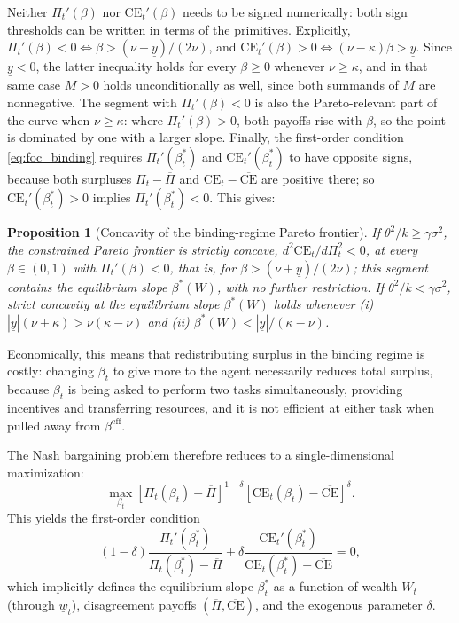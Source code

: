 \documentclass{article}
\newtheorem{proposition}{Proposition}[section]
\theoremstyle{definition}
\theoremstyle{plain}
\begin{document}
Neither $\Pi_t'(\beta)$ nor $\text{CE}_t'(\beta)$ needs to be signed numerically: both sign thresholds can be written in terms of the primitives. Explicitly, $\Pi_t'(\beta) < 0 \iff \beta > (\nu+\underline{y})/(2\nu)$, and $\text{CE}_t'(\beta) > 0 \iff (\nu-\kappa)\beta > \underline{y}$. Since $\underline{y}<0$, the latter inequality holds for every $\beta \geq 0$ whenever $\nu \geq \kappa$, and in that same case $M>0$ holds unconditionally as well, since both summands of $M$ are nonnegative. The segment with $\Pi_t'(\beta)<0$ is also the Pareto-relevant part of the curve when $\nu\ge\kappa$: where $\Pi_t'(\beta)>0$, both payoffs rise with $\beta$, so the point is dominated by one with a larger slope. Finally, the first-order condition \eqref{eq:foc_binding} requires $\Pi_t'(\beta_t^*)$ and $\text{CE}_t'(\beta_t^*)$ to have opposite signs, because both surpluses $\Pi_t-\overline\Pi$ and $\text{CE}_t-\overline{\text{CE}}$ are positive there; so $\text{CE}_t'(\beta_t^*)>0$ implies $\Pi_t'(\beta_t^*)<0$. This gives:\\
\begin{proposition}[Concavity of the binding-regime Pareto frontier]\label{prop:frontier_concavity}
If $\theta^2/k \ge \gamma\sigma^2$, the constrained Pareto frontier is strictly concave, $d^2\text{CE}_t/d\Pi_t^2 < 0$, at every $\beta \in (0,1)$ with $\Pi_t'(\beta)<0$, that is, for $\beta > (\nu+\underline{y})/(2\nu)$; this segment contains the equilibrium slope $\beta^*(W)$, with no further restriction. If $\theta^2/k < \gamma\sigma^2$, strict concavity at the equilibrium slope $\beta^*(W)$ holds whenever (i) $|\underline{y}|(\nu+\kappa) > \nu(\kappa-\nu)$ and (ii) $\beta^*(W) < |\underline{y}|/(\kappa-\nu)$.
\end{proposition}

Economically, this means that redistributing surplus in the binding regime is costly: changing $\beta_t$ to give more to the agent necessarily reduces total surplus, because $\beta_t$ is being asked to perform two tasks simultaneously, providing incentives and transferring resources, and it is not efficient at either task when pulled away from $\beta^{\text{eff}}$.

The Nash bargaining problem therefore reduces to a single-dimensional maximization:
\[
\max_{\beta_t} [\Pi_t(\beta_t) - \overline{\Pi}]^{1-\delta} [\text{CE}_t(\beta_t) - \overline{\text{CE}}]^{\delta}.
\]
This yields the first-order condition
\begin{equation}\label{eq:foc_binding}
(1-\delta) \frac{\Pi_t'(\beta_t^*)}{\Pi_t(\beta_t^*) - \overline{\Pi}} + \delta \frac{\text{CE}_t'(\beta_t^*)}{\text{CE}_t(\beta_t^*) - \overline{\text{CE}}} = 0,
\end{equation}
which implicitly defines the equilibrium slope $\beta_t^*$ as a function of wealth $W_t$ (through $\underline{w}_t$), disagreement payoffs $(\overline{\Pi}, \overline{\text{CE}})$, and the exogenous parameter $\delta$.
\end{document}
